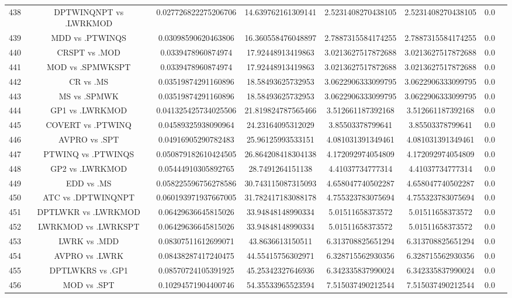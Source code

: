 \documentclass[a3paper,10pt]{article}
\begin{document}
\begin{table}[!htp]
\begin{tabular}{cccccccc}
438&DPTWINQNPT vs .LWRKMOD&0.027726822275206706&14.639762161309141&2.5231408270438105&2.5231408270438105&0.0\\
439&MDD vs .PTWINQS&0.03098590620463806&16.360558476048897&2.7887315584174255&2.7887315584174255&0.0\\
440&CRSPT vs .MOD&0.0339478960874974&17.92448913419863&3.0213627517872688&3.0213627517872688&0.0\\
441&MOD vs .SPMWKSPT&0.0339478960874974&17.92448913419863&3.0213627517872688&3.0213627517872688&0.0\\
442&CR vs .MS&0.03519874291160896&18.58493625732953&3.0622906333099795&3.0622906333099795&0.0\\
443&MS vs .SPMWK&0.03519874291160896&18.58493625732953&3.0622906333099795&3.0622906333099795&0.0\\
444&GP1 vs .LWRKMOD&0.041325425734025506&21.819824787565466&3.512661187392168&3.512661187392168&0.0\\
445&COVERT vs .PTWINQ&0.04589325938090964&24.23164095312029&3.85503378799641&3.85503378799641&0.0\\
446&AVPRO vs .SPT&0.04916905290782483&25.96125993533151&4.081031391349461&4.081031391349461&0.0\\
447&PTWINQ vs .PTWINQS&0.050879182610424505&26.864208418304138&4.172092974054809&4.172092974054809&0.0\\
448&GP2 vs .LWRKMOD&0.05444910305892765&28.7491264151138&4.41037734777314&4.41037734777314&0.0\\
449&EDD vs .MS&0.058225596756278586&30.743115087315093&4.658047740502287&4.658047740502287&0.0\\
450&ATC vs .DPTWINQNPT&0.060193971937667005&31.782417183088178&4.755323783075694&4.755323783075694&0.0\\
451&DPTLWKR vs .LWRKMOD&0.06429636645815026&33.94848148990334&5.01511658373572&5.01511658373572&0.0\\
452&LWRKMOD vs .LWRKSPT&0.06429636645815026&33.94848148990334&5.01511658373572&5.01511658373572&0.0\\
453&LWRK vs .MDD&0.08307511612699071&43.8636613150511&6.313708825651294&6.313708825651294&0.0\\
454&AVPRO vs .LWRK&0.08438287417240475&44.55415756302971&6.328715562930356&6.328715562930356&0.0\\
455&DPTLWKRS vs .GP1&0.08570724105391925&45.25342327646936&6.342335837990024&6.342335837990024&0.0\\
456&MOD vs .SPT&0.10294571904400746&54.35533965523594&7.515037490212544&7.515037490212544&0.0\\

\end{tabular}
\end{table}
\end{document}
